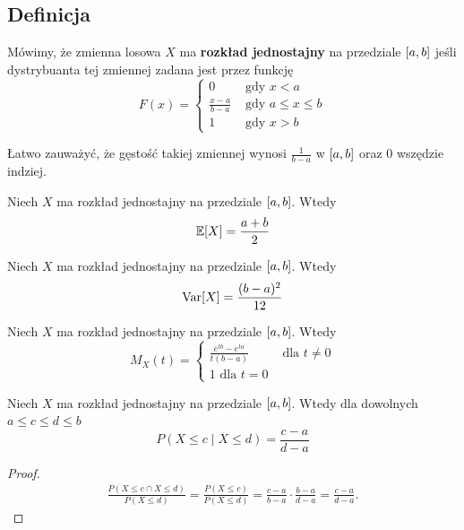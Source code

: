 \subsection{Definicja}
\begin{definition}
	Mówimy, że zmienna losowa \( X \) ma \textbf{rozkład jednostajny} na przedziale \( \left[a, b\right] \) jeśli dystrybuanta tej zmiennej zadana jest przez funkcję
	\[
		F(x) = \begin{cases}
			0                   & \text{ gdy } x < a           \\
			\frac{x - a}{b - a} & \text{ gdy } a \leq x \leq b \\
			1                   & \text{ gdy } x > b
		\end{cases}
	\]
\end{definition}
Łatwo zauważyć, że gęstość takiej zmiennej wynosi \( \frac{1}{b-a} \) w \( \left[a, b\right] \) oraz 0 wszędzie indziej.

\begin{theorem}
	Niech \( X \) ma rozkład jednostajny na przedziale \( \left[a, b\right] \). Wtedy
	\[
		\expected{X} = \frac{a + b}{2}
	\]
\end{theorem}

\begin{theorem}
	Niech \( X \) ma rozkład jednostajny na przedziale \( \left[a, b\right] \). Wtedy
	\[
		\variance{X} = \frac{(b-a)^2}{12}
	\]
\end{theorem}


\begin{theorem}
	Niech \( X \) ma rozkład jednostajny na przedziale \( \left[a, b\right] \). Wtedy
	\[
		M_X(t) = \begin{cases}
			\frac{e^{tb} - e^{ta}}{t(b-a)} & \text{ dla } t \neq 0 \\
			1 \text{ dla } t = 0
		\end{cases}
	\]
\end{theorem}

\begin{theorem}
	Niech \( X \) ma rozkład jednostajny na przedziale \( \left[a, b\right] \). Wtedy dla dowolnych \( a \leq c \leq d \leq b \)
	\[
		P(X \leq c \mid X \leq d) = \frac{c - a}{d - a}
	\]
\end{theorem}
\begin{proof}
	\begin{align*}
		\frac{P\left( X\le c \cap X\le d  \right) }{P\left( X\le d  \right) } = \frac{P\left( X\le c  \right) }{P\left( X\le d  \right) } = \frac{c-a}{b-a} \cdot \frac{b-a}{d-a} = \frac{c-a}{d-a}.
	\end{align*}
\end{proof}


